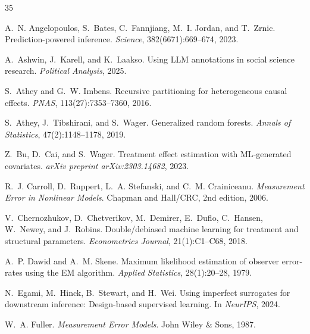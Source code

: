 \documentclass[11pt,twocolumn]{article}
\begin{document}
\begin{thebibliography}{35}

A.~N. Angelopoulos, S.~Bates, C.~Fannjiang, M.~I. Jordan, and T.~Zrnic.
\newblock Prediction-powered inference.
\newblock \emph{Science}, 382(6671):669--674, 2023.

A.~Ashwin, J.~Karell, and K.~Laakso.
\newblock Using {LLM} annotations in social science research.
\newblock \emph{Political Analysis}, 2025.

S.~Athey and G.~W. Imbens.
\newblock Recursive partitioning for heterogeneous causal effects.
\newblock \emph{PNAS}, 113(27):7353--7360, 2016.

S.~Athey, J.~Tibshirani, and S.~Wager.
\newblock Generalized random forests.
\newblock \emph{Annals of Statistics}, 47(2):1148--1178, 2019.

Z.~Bu, D.~Cai, and S.~Wager.
\newblock Treatment effect estimation with {ML}-generated covariates.
\newblock \emph{arXiv preprint arXiv:2303.14682}, 2023.

R.~J. Carroll, D.~Ruppert, L.~A. Stefanski, and C.~M. Crainiceanu.
\newblock \emph{Measurement Error in Nonlinear Models}.
\newblock Chapman and Hall/CRC, 2nd edition, 2006.

V.~Chernozhukov, D.~Chetverikov, M.~Demirer, E.~Duflo, C.~Hansen, W.~Newey, and J.~Robins.
\newblock Double/debiased machine learning for treatment and structural parameters.
\newblock \emph{Econometrics Journal}, 21(1):C1--C68, 2018.

A.~P. Dawid and A.~M. Skene.
\newblock Maximum likelihood estimation of observer error-rates using the {EM} algorithm.
\newblock \emph{Applied Statistics}, 28(1):20--28, 1979.

N.~Egami, M.~Hinck, B.~Stewart, and H.~Wei.
\newblock Using imperfect surrogates for downstream inference: Design-based supervised learning.
\newblock In \emph{NeurIPS}, 2024.

W.~A. Fuller.
\newblock \emph{Measurement Error Models}.
\newblock John Wiley \& Sons, 1987.


\end{thebibliography}
\end{document}
